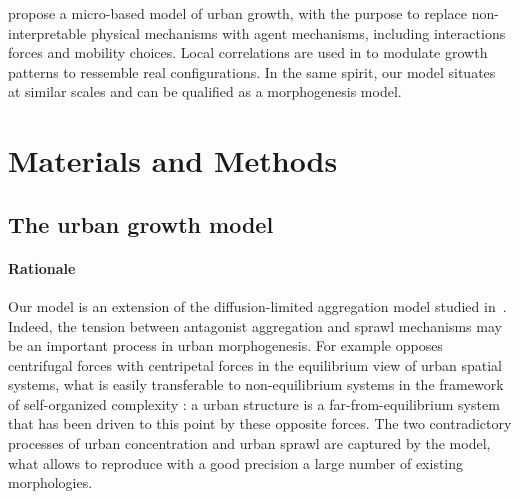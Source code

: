 \documentclass[10pt,letterpaper]{article}
\begin{document}
\cite{andersson2002urban} propose a micro-based model of urban growth, with the purpose to replace non-interpretable physical mechanisms with agent mechanisms, including interactions forces and mobility choices. Local correlations are used in \cite{makse1998modeling} to modulate growth patterns to ressemble real configurations. In the same spirit, our model situates at similar scales and can be qualified as a morphogenesis model. %








\section{Materials and Methods}

\subsection{The urban growth model}




\paragraph{Rationale}






Our model is an extension of the diffusion-limited aggregation model studied in~\cite{batty2006hierarchy}. Indeed, the tension between antagonist aggregation and sprawl mechanisms may be an important process in urban morphogenesis. For example \cite{fujita1996economics} opposes centrifugal forces with centripetal forces in the equilibrium view of urban spatial systems, what is easily transferable to non-equilibrium systems in the framework of self-organized complexity : a urban structure is a far-from-equilibrium system that has been driven to this point by these opposite forces. The two contradictory processes of urban concentration and urban sprawl are captured by the model, what allows to reproduce with a good precision a large number of existing morphologies.
\end{document}
